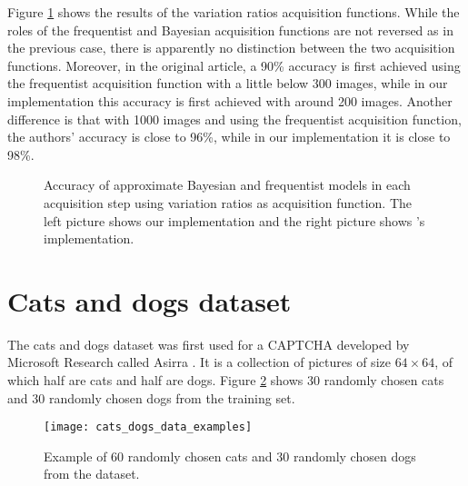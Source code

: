 Figure \ref{fig:mnist_var_ratios_AL} shows the results of the variation ratios acquisition functions. While the roles of the frequentist and Bayesian acquisition functions are not reversed as in the previous case, there is apparently no distinction between the two acquisition functions. Moreover, in the original article, a 90\% accuracy is first achieved using the frequentist acquisition function with a little below 300 images, while in our implementation this accuracy is first achieved with around 200 images. Another difference is that with 1000 images and using the frequentist acquisition function, the authors' accuracy is close to 96\%, while in our implementation it is close to 98\%.

\begin{figure}[H]
  \centering
  \hfill
  \caption{Accuracy of approximate Bayesian and frequentist models in each acquisition step using variation ratios as acquisition function. The left picture shows our implementation and the right picture shows \citeauthor{Gal2016Active}'s implementation.}
  \label{fig:mnist_var_ratios_AL}
\end{figure}


\section{Cats and dogs dataset}

The cats and dogs dataset was first used for a CAPTCHA developed by Microsoft Research called Asirra \cite{elson2007asirra}. It is a collection of  pictures of size $64 \times 64$, of which half are cats and half are dogs. Figure \ref{fig:cats_dogs_data_examples} shows 30 randomly chosen cats and 30 randomly chosen dogs from the training set.

\begin{figure}[H]
    \centering
    \texttt{[image: cats\_dogs\_data\_examples]}
    \caption{Example of 60 randomly chosen cats and 30 randomly chosen dogs from the dataset.}
    \label{fig:cats_dogs_data_examples}
\end{figure}

